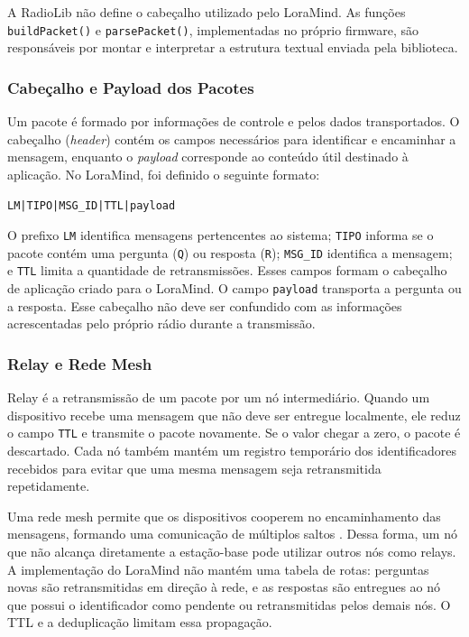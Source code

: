 \documentclass[12pt]{article}
\begin{document}
A RadioLib não define o cabeçalho utilizado pelo LoraMind. As funções \texttt{buildPacket()} e \texttt{parsePacket()}, implementadas no próprio firmware, são responsáveis por montar e interpretar a estrutura textual enviada pela biblioteca.

\subsubsection{Cabeçalho e Payload dos Pacotes}

Um pacote é formado por informações de controle e pelos dados transportados. O cabeçalho (\textit{header}) contém os campos necessários para identificar e encaminhar a mensagem, enquanto o \textit{payload} corresponde ao conteúdo útil destinado à aplicação. No LoraMind, foi definido o seguinte formato:

\begin{center}
  \texttt{LM|TIPO|MSG\_ID|TTL|payload}
\end{center}

O prefixo \texttt{LM} identifica mensagens pertencentes ao sistema; \texttt{TIPO} informa se o pacote contém uma pergunta (\texttt{Q}) ou resposta (\texttt{R}); \texttt{MSG\_ID} identifica a mensagem; e \texttt{TTL} limita a quantidade de retransmissões. Esses campos formam o cabeçalho de aplicação criado para o LoraMind. O campo \texttt{payload} transporta a pergunta ou a resposta. Esse cabeçalho não deve ser confundido com as informações acrescentadas pelo próprio rádio durante a transmissão.

\subsubsection{Relay e Rede Mesh}
\label{subsubsec:relay-mesh}

Relay é a retransmissão de um pacote por um nó intermediário. Quando um dispositivo recebe uma mensagem que não deve ser entregue localmente, ele reduz o campo \texttt{TTL} e transmite o pacote novamente. Se o valor chegar a zero, o pacote é descartado. Cada nó também mantém um registro temporário dos identificadores recebidos para evitar que uma mesma mensagem seja retransmitida repetidamente.

Uma rede mesh permite que os dispositivos cooperem no encaminhamento das mensagens, formando uma comunicação de múltiplos saltos \cite{poke2023empirical}. Dessa forma, um nó que não alcança diretamente a estação-base pode utilizar outros nós como relays. A implementação do LoraMind não mantém uma tabela de rotas: perguntas novas são retransmitidas em direção à rede, e as respostas são entregues ao nó que possui o identificador como pendente ou retransmitidas pelos demais nós. O TTL e a deduplicação limitam essa propagação.
\end{document}
